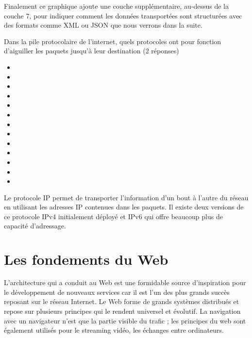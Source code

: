   Finalement ce graphique ajoute une couche supplémentaire, au-dessus de la couche 7, pour indiquer comment les données transportées sont structurées avec des formats comme \ac{XML} ou \ac{JSON} que nous verrons dans la suite.
  
  
  {Dans la pile protocolaire de l'internet, quels protocoles ont pour fonction d'aiguiller les paquets jusqu'à leur destination (2 réponses) 
  \begin{multicols}{4}
  \begin{itemize}[label=$\square$]
   \item {}
   \item {}
   \item {}
   \item {}
   \item {}
   \item {}
   \item {}
   \item {}
   \item {} 
   \item {}
   \item {}
   \item {}
   \item {}
  \end{itemize}
  \end{multicols}
  }
  {Le protocole \ac{IP} permet de transporter l'information d'un bout à l'autre du réseau en utilisant les adresses \ac{IP} contenues dans les paquets. Il existe deux versions de ce protocole \ac{IPv4} initialement déployé et \ac{IPv6} qui offre beaucoup plus de capacité d'adressage.}
  
  \section{Les fondements du Web}
  
    \vspace{1em}

  L'architecture qui a conduit au Web est une formidable source d’inspiration pour le développement de nouveaux services car il est l’un des plus grands succès reposant sur le réseau Internet. Le Web forme de grands systèmes distribués et repose sur plusieurs principes qui le rendent universel et évolutif. La navigation avec un navigateur n’est que la partie visible du trafic ; les principes du web sont également utilisés pour le streaming vidéo, les échanges entre ordinateurs. 
  
